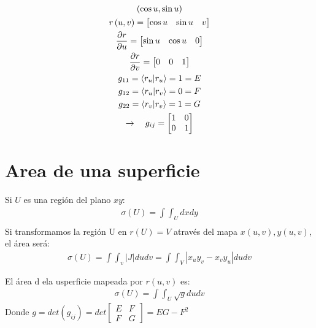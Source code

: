 \documentclass{article}
\newcommand{\caja}[3]{%
  \begin{tcolorbox}[colback=#1!5!white,colframe=#1!25!black,title=#2]
    #3
  \end{tcolorbox}%
}
\begin{document}
\begin{gather}
  (\cos{u }, \sin{u })\\
  r\left(u,v\right)=\begin{bmatrix} \cos{u } & \sin{u } & v \end{bmatrix}\\
  \frac{\partial r  }{\partial u } = \begin{bmatrix} \sin{u } & \cos{u } & 0  \end{bmatrix}\\
  \frac{\partial r  }{\partial v } = \begin{bmatrix} 0  & 0  & 1 \end{bmatrix}\\
  g _{11}  = \bra{r_u }\ket{r_u } = 1 = E\\
  g _{12 }  = \bra{r_u }\ket{r_v } = 0 = F  \\
  g _{22 }  = \bra{r_v }\ket{r_v } = 1 = G \\
  \rightarrow \quad g _{ij }  = \begin{bmatrix}
      1 & 0 \\
      0  & 1
  \end{bmatrix}  
\end{gather}

\section{Area de una superficie }
Si $ U  $ es una región del plano $ xy  $: 
\begin{gather}
  \sigma (U) = \int \int_{U }^{} dxdy\\
\end{gather}
Si transformamos la región U en $ r(U) = V  $ através del mapa $ x(u,v), y(u,v) $, el área será:
\begin{gather}
   \sigma (U) = \int \int_{v }^{} \left|J \right|dudv = \int \int_{V }^{} \left|x_uy_v - x_vy_u\right|dudv
\end{gather}
\caja{green}{Definicion }{
  El área d ela usperficie mapeada por $ r(u,v) $ es: 
  \begin{gather}
    \sigma(U) = \int \int_{U }^{}\sqrt{g } du dv 
    \label{eq:def_area}
  \end{gather}
  Donde $ g = det(g _{ij } ) = det \begin{bmatrix}
      E & F \\
      F & G
  \end{bmatrix} = EG- F ^2  $
}

\hfill
\end{document}
